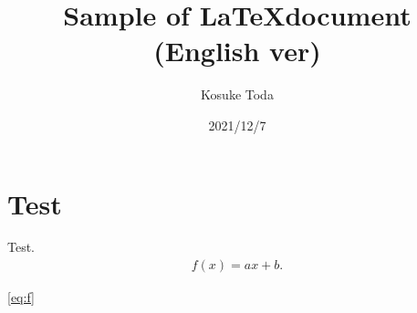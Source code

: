 \documentclass{article}
\begin{document}
    \title{Sample of \LaTeX document (English ver)}
    \author{Kosuke Toda}
    \date{2021/12/7}
    \maketitle

    \section{Test}
    Test.
    \begin{align}
        f(x) = ax + b. \label{eq:f}
    \end{align}
    
    \eqref{eq:f}
\end{document}

